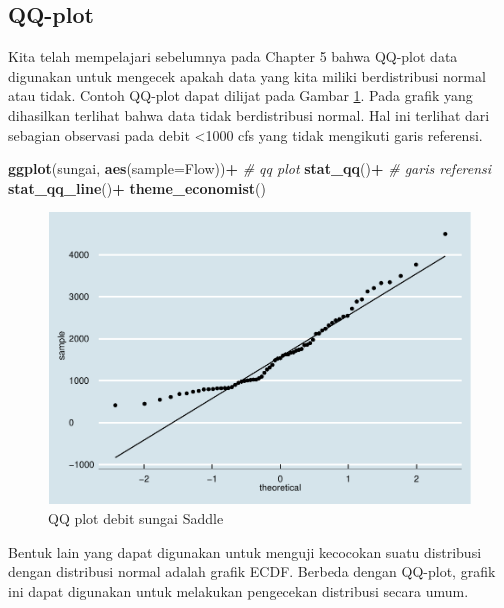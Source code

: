\documentclass[]{book}
\newenvironment{Shaded}{\begin{snugshade}}{\end{snugshade}}
\newcommand{\KeywordTok}[1]{\textcolor[rgb]{0.13,0.29,0.53}{\textbf{#1}}}
\newcommand{\DataTypeTok}[1]{\textcolor[rgb]{0.13,0.29,0.53}{#1}}
\newcommand{\StringTok}[1]{\textcolor[rgb]{0.31,0.60,0.02}{#1}}
\newcommand{\CommentTok}[1]{\textcolor[rgb]{0.56,0.35,0.01}{\textit{#1}}}
\newcommand{\OperatorTok}[1]{\textcolor[rgb]{0.81,0.36,0.00}{\textbf{#1}}}
\newcommand{\NormalTok}[1]{#1}
\begin{document}
\subsection{QQ-plot}\label{qq-plot-2}

Kita telah mempelajari sebelumnya pada Chapter 5 bahwa QQ-plot data
digunakan untuk mengecek apakah data yang kita miliki berdistribusi
normal atau tidak. Contoh QQ-plot dapat dilijat pada Gambar
\ref{fig:qqeda}. Pada grafik yang dihasilkan terlihat bahwa data tidak
berdistribusi normal. Hal ini terlihat dari sebagian observasi pada
debit \textless{}1000 cfs yang tidak mengikuti garis referensi.

\begin{Shaded}
\begin{Highlighting}[]
\KeywordTok{ggplot}\NormalTok{(sungai, }\KeywordTok{aes}\NormalTok{(}\DataTypeTok{sample=}\NormalTok{Flow))}\OperatorTok{+}
\StringTok{  }\CommentTok{# qq plot}
\StringTok{  }\KeywordTok{stat_qq}\NormalTok{()}\OperatorTok{+}
\StringTok{  }\CommentTok{# garis referensi}
\StringTok{  }\KeywordTok{stat_qq_line}\NormalTok{()}\OperatorTok{+}
\StringTok{  }\KeywordTok{theme_economist}\NormalTok{()}
\end{Highlighting}
\end{Shaded}

\begin{figure}

{\centering \includegraphics[width=0.7\linewidth]{EnvStat_files/figure-latex/qqeda-1} 

}

\caption{QQ plot debit sungai Saddle}\label{fig:qqeda}
\end{figure}

Bentuk lain yang dapat digunakan untuk menguji kecocokan suatu
distribusi dengan distribusi normal adalah grafik ECDF. Berbeda dengan
QQ-plot, grafik ini dapat digunakan untuk melakukan pengecekan
distribusi secara umum.
\end{document}
